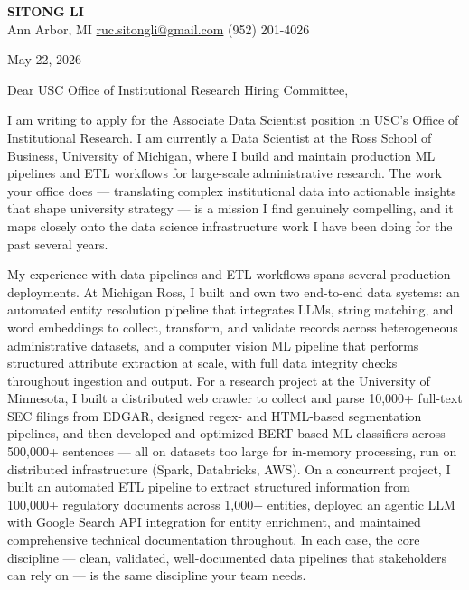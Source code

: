 \documentclass[12pt]{article}
\begin{document}
\begin{center}
  {\LARGE\textbf{\textcolor{accent}{SITONG LI}}} \\[4pt]
  \small Ann Arbor, MI
  \;\textbullet\;
  \href{mailto:ruc.sitongli@gmail.com}{ruc.sitongli@gmail.com}
  \;\textbullet\;
  (952) 201-4026
\end{center}

\vspace{1em}

\noindent May 22, 2026

\vspace{1em}

\noindent Dear USC Office of Institutional Research Hiring Committee,

\vspace{1em}

I am writing to apply for the Associate Data Scientist position in USC's Office of Institutional Research. I am currently a Data Scientist at the Ross School of Business, University of Michigan, where I build and maintain production ML pipelines and ETL workflows for large-scale administrative research. The work your office does --- translating complex institutional data into actionable insights that shape university strategy --- is a mission I find genuinely compelling, and it maps closely onto the data science infrastructure work I have been doing for the past several years.

My experience with data pipelines and ETL workflows spans several production deployments. At Michigan Ross, I built and own two end-to-end data systems: an automated entity resolution pipeline that integrates LLMs, string matching, and word embeddings to collect, transform, and validate records across heterogeneous administrative datasets, and a computer vision ML pipeline that performs structured attribute extraction at scale, with full data integrity checks throughout ingestion and output. For a research project at the University of Minnesota, I built a distributed web crawler to collect and parse 10,000+ full-text SEC filings from EDGAR, designed regex- and HTML-based segmentation pipelines, and then developed and optimized BERT-based ML classifiers across 500,000+ sentences --- all on datasets too large for in-memory processing, run on distributed infrastructure (Spark, Databricks, AWS). On a concurrent project, I built an automated ETL pipeline to extract structured information from 100,000+ regulatory documents across 1,000+ entities, deployed an agentic LLM with Google Search API integration for entity enrichment, and maintained comprehensive technical documentation throughout. In each case, the core discipline --- clean, validated, well-documented data pipelines that stakeholders can rely on --- is the same discipline your team needs.
\end{document}
